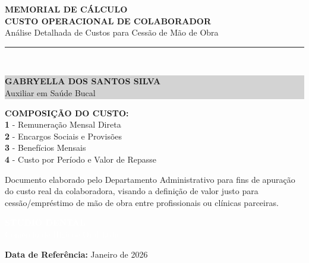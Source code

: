\documentclass[12pt, a4paper]{article}
\begin{document}
\begin{titlepage}
    \centering
    \vspace*{3cm}
    {\Huge \textbf{\textcolor{primaryColor}{MEMORIAL DE CÁLCULO}}} \\
    \vspace{0.5cm}
    {\Large \textbf{CUSTO OPERACIONAL DE COLABORADOR}} \\
    \vspace{0.3cm}
    {\large Análise Detalhada de Custos para Cessão de Mão de Obra} \\
    \vspace{2cm}
    \rule{10cm}{1.5pt} \\
    \vspace{0.5cm}
    \colorbox{lightGray}{%
        \parbox{0.9\textwidth}{%
            \centering
            \vspace{0.3cm}
            {\Large \textbf{GABRYELLA DOS SANTOS SILVA}} \\
            \vspace{0.2cm}
            {\large Auxiliar em Saúde Bucal} \\
            \vspace{0.3cm}
        }%
    }
    \vspace{2cm}

    \begin{flushleft}
    \textbf{COMPOSIÇÃO DO CUSTO:} \\
    \vspace{0.2cm}
    \textcolor{primaryColor}{\textbf{1}} - Remuneração Mensal Direta \\
    \textcolor{primaryColor}{\textbf{2}} - Encargos Sociais e Provisões \\
    \textcolor{primaryColor}{\textbf{3}} - Benefícios Mensais \\
    \textcolor{primaryColor}{\textbf{4}} - Custo por Período e Valor de Repasse
    \end{flushleft}

    \vfill
    {\small Documento elaborado pelo Departamento Administrativo para fins de apuração do custo real da colaboradora, visando a definição de valor justo para cessão/empréstimo de mão de obra entre profissionais ou clínicas parceiras.} \\
    \vspace{1.5cm}

    \colorbox{accentColor}{%
        \parbox{0.9\textwidth}{%
            \centering
            \vspace{0.6cm}
            \textcolor{white}{\Large \textbf{STUDIO DENTAL}} \\
            \vspace{0.2cm}
            \textcolor{white}{\normalsize Comércio de Higiene Oral Ltda.} \\
            \vspace{0.6cm}
        }%
    }

    \vspace{0.2cm}
    \textbf{Data de Referência:} Janeiro de 2026
\end{titlepage}
\end{document}
